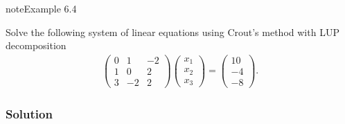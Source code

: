 \documentclass[letterpaper,10pt,english]{jupyterBook}
\begin{document}
\begin{sphinxadmonition}{note}{Example 6.4}

\sphinxAtStartPar
Solve the following system of linear equations using Crout’s method with LUP decomposition
\begin{align*}
    \begin{pmatrix}
        0 & 1 & -2\\
        1 & 0 & 2\\
        3 & -2 & 2
    \end{pmatrix}
    \begin{pmatrix} x_1 \\ x_2 \\ x_3 \end{pmatrix} =
    \begin{pmatrix} 10 \\ -4 \\ -8 \end{pmatrix}.
\end{align*}\subsubsection*{Solution}


\end{sphinxadmonition}
\end{document}
